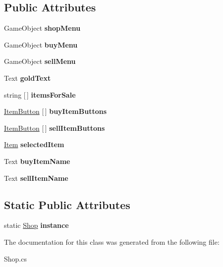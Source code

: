 \subsection*{Public Attributes}
\begin{DoxyCompactItemize}
\item 
\mbox{\label{class_shop_ab2c346dd413a15bb50ed366976372b7a}} 
Game\+Object {\bfseries shop\+Menu}
\item 
\mbox{\label{class_shop_a642567d9e35008883555332ec9d3db9b}} 
Game\+Object {\bfseries buy\+Menu}
\item 
\mbox{\label{class_shop_ad1f49aa0728c67d66bb52639fbde6d76}} 
Game\+Object {\bfseries sell\+Menu}
\item 
\mbox{\label{class_shop_ab6bf1a84048b6bd125330d65bb0b8429}} 
Text {\bfseries gold\+Text}
\item 
\mbox{\label{class_shop_a793b573a105c15130c210018497ebf48}} 
string \mbox{[}$\,$\mbox{]} {\bfseries items\+For\+Sale}
\item 
\mbox{\label{class_shop_a68399298d2b2aac620f3a0646e2a77d5}} 
\mbox{\hyperlink{class_item_button}{Item\+Button}} \mbox{[}$\,$\mbox{]} {\bfseries buy\+Item\+Buttons}
\item 
\mbox{\label{class_shop_a61276c0e4278671e42342898acca1931}} 
\mbox{\hyperlink{class_item_button}{Item\+Button}} \mbox{[}$\,$\mbox{]} {\bfseries sell\+Item\+Buttons}
\item 
\mbox{\label{class_shop_ad27bae8a113923a4c6bd82c06c7ec087}} 
\mbox{\hyperlink{class_item}{Item}} {\bfseries selected\+Item}
\item 
\mbox{\label{class_shop_a509dfeb1fb490ce269e8c5197c2db0cd}} 
Text {\bfseries buy\+Item\+Name}
\item 
\mbox{\label{class_shop_a027aee573d51cf6d7499b7cd3d8b735d}} 
Text {\bfseries sell\+Item\+Name}
\end{DoxyCompactItemize}
\subsection*{Static Public Attributes}
\begin{DoxyCompactItemize}
\item 
\mbox{\label{class_shop_a8b604537950072102c117288ba460e99}} 
static \mbox{\hyperlink{class_shop}{Shop}} {\bfseries instance}
\end{DoxyCompactItemize}


The documentation for this class was generated from the following file\+:\begin{DoxyCompactItemize}
\item 
Shop.\+cs\end{DoxyCompactItemize}
